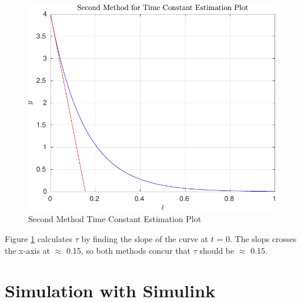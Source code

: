 \documentclass[12pt]{article}
\begin{document}
	  	\begin{figure}[H]
	  		\centering
	  		\includegraphics[width=1\linewidth]{"Code/Fig/second_method_time_constant_plot_line.pdf"}
	  		\caption{Second Method Time Constant Estimation Plot}
	  		\label{fig:second_method_time_constant_plot}
	  	\end{figure}
  		Figure \ref{fig:second_method_time_constant_plot} calculates $\tau$ by finding the slope of the curve at $t$ = 0. The slops crosses the x-axis at $\approx$ 0.15, so both methods concur that $\tau$ should be $\approx$ 0.15.
	\section{Simulation with Simulink}
\end{document}
